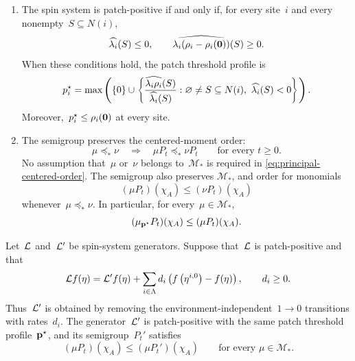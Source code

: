 \begin{theorem}
\label{thm:patch-positivity-order}
\leavevmode
\begin{enumerate}[label=\textup{(\roman*)}]
\item The spin system is patch-positive if and only if, for every site~$i$ and
every nonempty~$S\subseteq N(i)$,
\begin{equation}
\label{eq:principal-coefficient-criterion}
\widehat{\lambda_i}(S)\leq0,
\qquad
\widehat{\lambda_i(\rho_i-\rho_i(\mathbf{0}))}(S)\geq0.
\end{equation}
When these conditions hold, the patch threshold profile is
\begin{equation}
\label{eq:principal-threshold-profile}
p_i^\star
=
\max\left(
\left\{0\right\}
\cup
\left\{
\frac{\widehat{\lambda_i\rho_i}(S)}{\widehat{\lambda_i}(S)}:
\varnothing\neq S\subseteq N(i),\ \widehat{\lambda_i}(S)<0
\right\}
\right).
\end{equation}
Moreover,~$p_i^\star\leq\rho_i(\mathbf{0})$ at every site.

\item The semigroup preserves the centered-moment order:
\begin{equation}
\label{eq:principal-centered-order}
\mu\preceq_*\nu
\quad\Longrightarrow\quad
\mu P_t\preceq_*\nu P_t
\qquad
\text{for every }t\geq0.
\end{equation}
No assumption that~$\mu$ or~$\nu$ belongs to~$\mathcal M_*$ is required in
\eqref{eq:principal-centered-order}. The semigroup also preserves
$\mathcal M_*$, and order for monomials
\begin{equation*}
(\mu P_t)(\chi_A)\leq(\nu P_t)(\chi_A)
\end{equation*}
whenever~$\mu\preceq_*\nu$. In particular, for every~$\mu\in\mathcal M_*$,
\begin{equation*}
(\mu_{\mathbf{p}^\star}P_t)(\chi_A)
\leq
(\mu P_t)(\chi_A).
\end{equation*}
\end{enumerate}
\end{theorem}

\begin{corollary}
\label{cor:pure-death-comparison}
Let~$\mathcal{L}$ and~$\mathcal{L}'$ be spin-system generators. Suppose that~$\mathcal{L}$ is
patch-positive and that
\begin{equation}
\label{eq:pure-death-decomposition}
\mathcal{L} f(\eta)
=
\mathcal{L}'f(\eta)
+
\sum_{i\in\Lambda}d_i
\left(f\left(\eta^{i,0}\right)-f(\eta)\right),
\qquad d_i\geq0.
\end{equation}
Thus~$\mathcal{L}'$ is obtained by removing the environment-independent~$1\to0$
transitions with rates~$d_i$. The generator~$\mathcal{L}'$ is patch-positive with
the same patch threshold profile~$\mathbf{p}^\star$, and its semigroup~$P_t'$
satisfies
\begin{equation}
\label{eq:principal-pure-death-comparison}
(\mu P_t)(\chi_A)
\leq
(\mu P_t')(\chi_A)
\qquad
\text{for every }\mu\in\mathcal M_*.
\end{equation}
\end{corollary}

